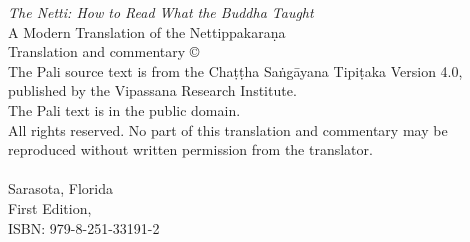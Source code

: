 \thispagestyle{empty}
\vspace*{\fill}

\begin{small}
\noindent
\textit{The Netti: How to Read What the Buddha Taught}\\
A Modern Translation of the Nettippakaraṇa\\[6pt]
Translation and commentary \copyright\ \editionyear\ \translatorname\\[6pt]
The Pali source text is from the Chaṭṭha Saṅgāyana Tipiṭaka Version 4.0,\\
published by the Vipassana Research Institute.\\
The Pali text is in the public domain.\\[12pt]
All rights reserved. No part of this translation and commentary may be reproduced
without written permission from the translator.\\[12pt]
\publisher\\
Sarasota, Florida\\[6pt]
First Edition, \editionyear\\[12pt]
ISBN: 979-8-251-33191-2
\end{small}

\cleardoublepage

